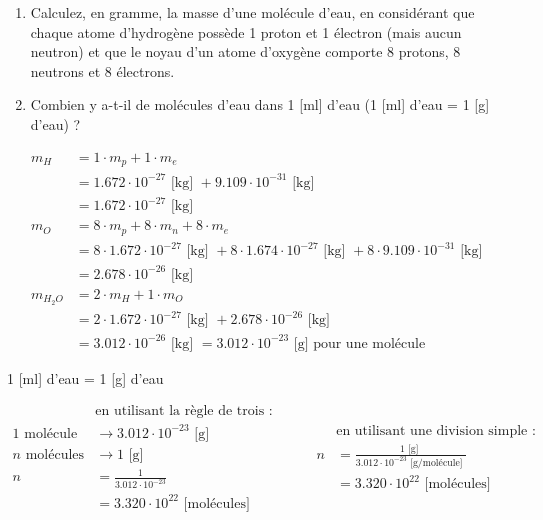 \documentclass[
  11pt,
  a4paper,
  openany]{book}
\providecommand{\tightlist}{%
  \setlength{\itemsep}{0pt}\setlength{\parskip}{0pt}}
\begin{document}
\begin{Exercise}

\begin{enumerate}
\def\labelenumi{\arabic{enumi}.}
\tightlist
\item
  Calculez, en gramme, la masse d'une molécule d'eau, en considérant que chaque atome d'hydrogène possède 1 proton et 1 électron (mais aucun neutron) et que le noyau d'un atome d'oxygène comporte 8 protons, 8 neutrons et 8 électrons.
\item
  Combien y a-t-il de molécules d'eau dans 1 {[}ml{]} d'eau (1 {[}ml{]} d'eau = 1 {[}g{]} d'eau) ?
\end{enumerate}

\end{Exercise}

\begin{Answer}
\[ \begin{split}
    m_{H} &= 1 \cdot m_{p} + 1 \cdot m_{e}\\
          &= 1.672\cdot10^{-27}\text{ [kg] } + 9.109\cdot10^{-31}\text{ [kg] }\\
          &= 1.672\cdot10^{-27}\text{ [kg] }\\
    m_{O} &= 8 \cdot m_{p} + 8 \cdot m_{n} + 8 \cdot m_{e}\\
          &= 8 \cdot 1.672\cdot10^{-27}\text{ [kg] } + 8 \cdot 1.674\cdot10^{-27}\text{ [kg] } + 8 \cdot 9.109\cdot10^{-31}\text{ [kg] }\\
          &= 2.678\cdot10^{-26}\text{ [kg] }\\
    m_{H_{2}O} &= 2 \cdot m_{H} + 1 \cdot m_{O}\\
          &= 2 \cdot 1.672\cdot10^{-27}\text{ [kg] } + 2.678\cdot10^{-26}\text{ [kg] }\\
          &= 3.012\cdot10^{-26}\text{ [kg] } = 3.012\cdot10^{-23} \text{ [g] pour une molécule}
\end{split} \]

1 {[}ml{]} d'eau = 1 {[}g{]} d'eau

\[ \begin{split}
    & \text{en utilisant la règle de trois : } \\
    1 \text{ molécule} &\rightarrow 3.012\cdot10^{-23} \text{ [g] }\\
    n \text{ molécules} &\rightarrow 1 \text{ [g] }\\
    n &= \frac{1}{3.012\cdot10^{-23}}\\
      &= 3.320\cdot10^{22} \text{ [molécules]}
\end{split}
\qquad
\begin{split}
    & \text{en utilisant une division simple : } \\
    n &= \frac{1\text{ [g] }}{ 3.012\cdot10^{-23} \text{ [g/molécule] } } \\
    &= 3.320\cdot10^{22} \text{ [molécules]}
\end{split} \]

\end{Answer}
\end{document}
